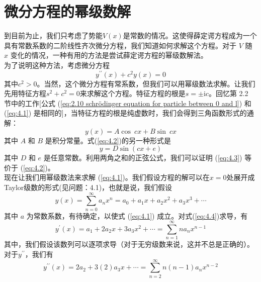 \section{微分方程的幂级数解}
\label{sec:4.1 Power-Series Solutions of Differential Equations}
    到目前为止，我们只考虑了势能$V\left(x\right)$是常数的情况。这使得薛定谔方程成为一个具有常数系数的二阶线性齐次微分方程，我们知道如何求解这个方程。对于 $V$ 随 $x$ 变化的情况，一种有用的方法是尝试薛定谔方程的幂级数解法。\\
    \indent 为了说明这种方法，考虑微分方程
    \begin{equation}
        y^{\prime\prime}\left(x\right) + c^2 y\left(x\right) = 0
        \label{eq:4.1}
    \end{equation}
    其中$c^2>0$。当然，这个微分方程有常系数，但我们可以用幂级数法求解。让我们先用特征方程$s^2+c^2=0$来求解这个方程。特征方程的根是$s=\pm \mathrm{i}c$。回忆第 2.2 节中的工作[公式 (\ref{eq:2.10 schrödinger equation for particle between 0 and l}) 和 (\ref{eq:4.1}) 是相同的]，当特征方程的根是纯虚数时，我们会得到三角函数形式的通解：
    \begin{equation}
        y\left(x\right) = A \cos\: cx + B \sin\: cx
        \label{eq:4.2}
    \end{equation}
    其中 $A$ 和 $B$ 是积分常量。式(\ref{eq:4.2})的另一种形式是
    \begin{equation}
        y = D \sin\left(cx+e\right)
        \label{eq:4.3}
    \end{equation}
    其中 $D$ 和 $e$ 是任意常数。利用两角之和的正弦公式，我们可以证明 (\ref{eq:4.3}) 等价于 (\ref{eq:4.2})。\\
    \indent 现在让我们用幂级数法来求解 (\ref{eq:4.1})。我们假设方程的解可以在$x=0$处展开成Taylor级数的形式(见问题：4.1)，也就是说，我们假设
    \begin{equation}
        y\left(x\right) = \sum_{n=0}^{\infty}a_nx^n = a_0 + a_1 x + a_2 x^2 + a_3 x^3 + \cdots
        \label{eq:4.4}
    \end{equation}
    其中 $a$ 为常数系数，有待确定，以使式 (\ref{eq:4.1}) 成立。对式(\ref{eq:4.4})求导，有
    \begin{equation}
        y^{\prime}\left(x\right) = a_1 + 2a_2 x + 3a_3 x^2 + \cdots = \sum_{n=1}^{\infty}na_nx^{n-1}
        \label{eq:4.5}
    \end{equation}
    其中，我们假设该数列可以逐项求导（对于无穷级数来说，这并不总是正确的）。对于$y^{\prime\prime}$，我们有
    \begin{equation}
        y^{\prime\prime}\left(x\right) = 2a_2 + 3\left(2\right)a_3 x + \cdots = \sum_{n=2}^{\infty}n(n-1)a_nx^{n-2}
        \label{eq:4.6}
    \end{equation}
